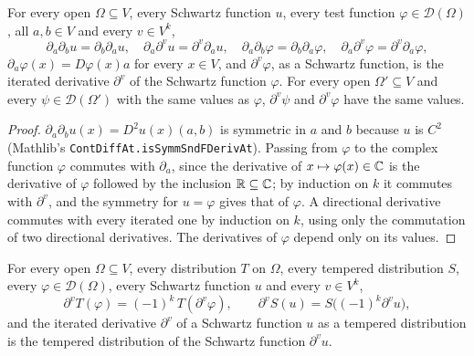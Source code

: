 \begin{lemma}
\label{lem:directional-derivatives-commute}
\leanok
{}
For every open $\Omega \subseteq V$, every Schwartz function $u$, every test function
$\varphi \in \mathcal D(\Omega)$, all $a, b \in V$ and every $v \in V^k$,
\[
  \partial_a \partial_b u = \partial_b \partial_a u, \quad
  \partial_a \partial^v u = \partial^v \partial_a u, \quad
  \partial_a \partial_b \varphi = \partial_b \partial_a \varphi, \quad
  \partial_a \partial^v \varphi = \partial^v \partial_a \varphi ,
\]
$\partial_a \varphi(x) = D\varphi(x) a$ for every $x \in V$, and $\partial^v \varphi$, as a
Schwartz function, is the iterated derivative $\partial^v$ of the Schwartz function $\varphi$. For
every open $\Omega' \subseteq V$ and every
$\psi \in \mathcal D(\Omega')$ with the same values as $\varphi$, $\partial^v \psi$ and
$\partial^v \varphi$ have the same values.
\end{lemma}

\begin{proof}
\leanok
$\partial_a \partial_b u(x) = D^2 u(x)(a, b)$ is symmetric in $a$ and $b$ because $u$ is $C^2$
(Mathlib's \texttt{ContDiffAt.\allowbreak isSymmSndFDerivAt}). Passing from $\varphi$ to the
complex function $\varphi$ commutes with $\partial_a$, since the derivative of $x \mapsto
\varphi(x) \in \mathbb{C}$ is the derivative of $\varphi$ followed by the inclusion $\mathbb{R} \subseteq \mathbb{C}$; by
induction on $k$ it commutes with $\partial^v$, and the symmetry for $u = \varphi$ gives that of
$\varphi$. A directional derivative commutes with every iterated one by induction on $k$, using
only the commutation of two directional derivatives. The derivatives of $\varphi$ depend only on
its values.
\end{proof}

\begin{lemma}
\label{lem:distribution-transpose}
\leanok
{}
For every open $\Omega \subseteq V$, every distribution $T$ on $\Omega$, every tempered
distribution $S$, every $\varphi \in \mathcal D(\Omega)$, every Schwartz function $u$ and every
$v \in V^k$,
\[
  \partial^v T(\varphi) = (-1)^k \, T(\partial^v \varphi), \qquad
  \partial^v S(u) = S\bigl((-1)^k \partial^v u\bigr),
\]
and the iterated derivative $\partial^v$ of a Schwartz function $u$ as a tempered distribution
is the tempered distribution of the Schwartz function $\partial^v u$.
\end{lemma}

